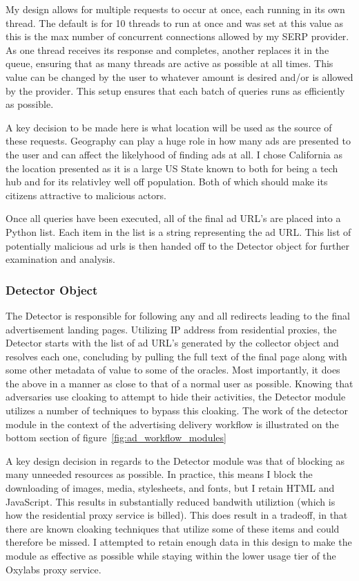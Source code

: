 \documentclass[sigconf]{acmart}
\begin{document}
My design allows for multiple requests to occur at once, each running in its own
thread.
The default is for 10 threads to run at once and was set at this value as this
is the max number of concurrent connections allowed by my SERP provider.
As one thread receives its response and completes, another replaces it in the
queue, ensuring that as many threads are active as possible at all times.
This value can be changed by the user to whatever amount is desired and/or is
allowed by the provider.
This setup ensures that each batch of queries runs as efficiently as possible.

A key decision to be made here is what location will be used as the source of
these requests.
Geography can play a huge role in how many ads are presented to
the user and can affect the likelyhood of finding ads at all.
I chose California as the location presented as it is a large US State known to
both for being a tech hub and for its relativley well off population.
Both of which should make its citizens attractive to malicious actors.

Once all queries have been executed, all of the final ad URL's are placed into
a Python list.
Each item in the list is a string representing the ad URL.
This list of potentially malicious ad urls is then handed off
to the Detector object for further examination and analysis.

\subsubsection{Detector Object}
The Detector is responsible for following any and all redirects leading to the
final advertisement landing pages.
Utilizing IP address from residential proxies, the Detector starts with the
list of ad URL's generated
by the collector object and resolves each one, concluding by pulling the full
text of the final page along with some other metadata of value to some of the
oracles.
Most importantly, it does the above in a manner as close to that of a normal
user as possible.
Knowing that adversaries use cloaking to attempt to hide their activities, the
Detector module utilizes a number of techniques to bypass this cloaking.
The work of the detector module in the
context of the advertising delivery workflow is illustrated on the bottom section of
figure~\ref{fig:ad_workflow_modules}

A key design decision in regards to the Detector module was that of blocking
as many unneeded resources as possible.
In practice, this means I block the downloading of images, media, stylesheets,
and fonts, but I retain HTML and JavaScript.
This results in substantially reduced bandwith utiliztion (which is how the
residential proxy service is billed).
This does result in a tradeoff, in that there are known cloaking techniques that
utilize some of these items and could therefore be missed.
I attempted to retain enough data in this design to make the module as effective
as possible while staying within the lower usage tier of the Oxylabs proxy
service.
\end{document}
